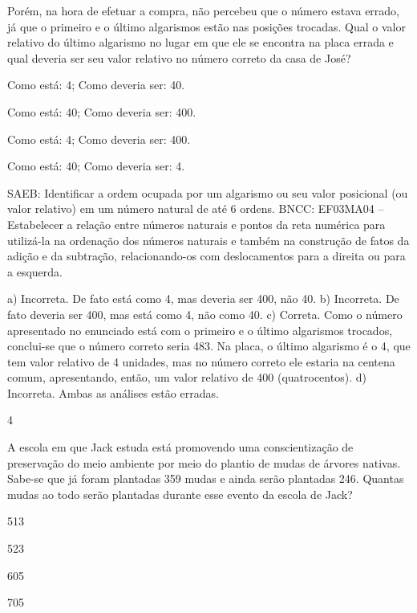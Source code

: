 \begin{multicols}{2}
\begin{enumerate}
{%

Porém, na hora de efetuar a compra, não percebeu que o número estava errado, já que o primeiro e o último algarismos estão nas posições
trocadas. Qual o valor relativo do último algarismo no lugar em que ele se
encontra na placa errada e qual deveria ser seu valor relativo no número correto da casa de José?

\begin{escolha}
\item
  Como está: 4; Como deveria ser: 40.
\item
  Como está: 40; Como deveria ser: 400.
\item
  Como está: 4; Como deveria ser: 400.
\item
  Como está: 40; Como deveria ser: 4.
\end{escolha}

SAEB: Identificar a ordem ocupada por um algarismo ou seu
valor posicional (ou valor relativo) em um número natural de até 6
ordens.
BNCC: EF03MA04 -- Estabelecer a relação entre números naturais e pontos da reta numérica para
utilizá-la na ordenação dos números naturais e também na construção de fatos da adição e da
subtração, relacionando-os com deslocamentos para a direita ou para a esquerda.

a) Incorreta. De fato está como 4, mas deveria ser 400, não 40.
b) Incorreta. De fato deveria ser 400, mas está como 4, não como 40.
c) Correta. Como o número apresentado no enunciado está com o primeiro e o último
algarismos trocados, conclui-se que o número correto seria 483. Na placa,
o último algarismo é o 4, que tem valor relativo de 4 unidades, mas no
número correto ele estaria na centena comum, apresentando, então, um valor
relativo de 400 (quatrocentos).
d) Incorreta. Ambas as análises estão erradas.

\num{4}

A escola em que Jack estuda está promovendo uma conscientização de
preservação do meio ambiente por meio do plantio de mudas de árvores
nativas. Sabe-se que já foram plantadas 359 mudas e ainda serão
plantadas 246. Quantas mudas ao todo serão plantadas durante esse evento
da escola de Jack?

\begin{escolha}
\item
  513
\item
  523
\item
  605
\item
  705
\end{escolha}

}
\end{enumerate}
\end{multicols}
